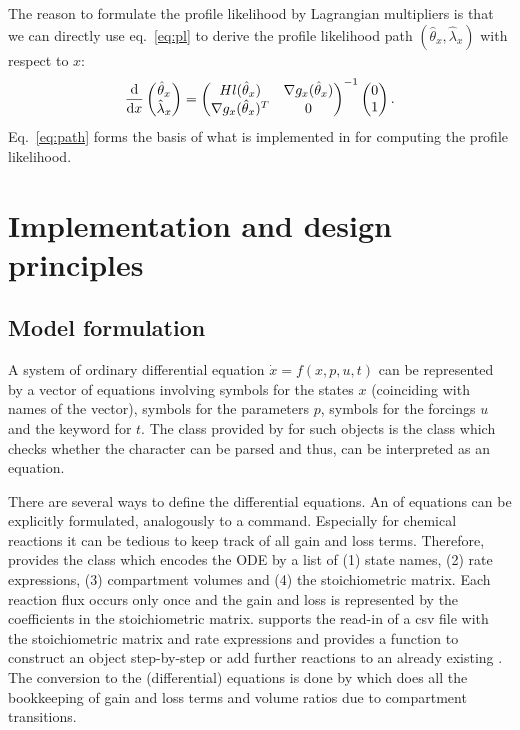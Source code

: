 \documentclass[article]{jss}
\begin{document}
The reason to formulate the profile likelihood by Lagrangian multipliers is that we can directly use eq.~\eqref{eq:pl} to derive the profile likelihood path $(\hat \theta_x, \hat\lambda_x)$ with respect to $x$:
\begin{align}
	\frac{\rm d}{{\rm d} x}
	\begin{pmatrix}
		\hat\theta_x \\ \hat\lambda_x
	\end{pmatrix} =
	\begin{pmatrix}
		Hl(\hat\theta_x) & \nabla g_x(\hat \theta_x)\\
		\nabla g_x(\hat\theta_x)^T & 0
	\end{pmatrix}^{-1}
	\begin{pmatrix}
		0 \\ 1
	\end{pmatrix}.
	\label{eq:path}
\end{align}
Eq.~\eqref{eq:path} forms the basis of what is implemented in  for computing the profile likelihood.





\section{Implementation and design principles}
\label{sec:implementation}

\subsection{Model  formulation}

A system of ordinary differential equation $\dot x = f(x, p, u, t)$ can be represented by a  vector of equations involving symbols for the states $x$ (coinciding with names of the vector), symbols for the parameters $p$, symbols for the forcings $u$ and the keyword  for $t$. The class provided by  for such objects is the  class which checks whether the character can be parsed and thus, can be interpreted as an equation.

There are several ways to define the differential equations. An  of equations can be explicitly formulated, analogously to a  command. Especially for chemical reactions it can be tedious to keep track of all gain and loss terms. Therefore,  provides the  class which encodes the ODE by a list of (1) state names, (2) rate expressions, (3) compartment volumes and (4) the stoichiometric matrix. Each reaction flux occurs only once and the gain and loss is represented by the coefficients in the stoichiometric matrix.  supports the read-in of a csv file with the stoichiometric matrix and rate expressions and provides a function  to construct an  object step-by-step or add further reactions to an already existing . The conversion to the (differential) equations is done by  which does all the bookkeeping of gain and loss terms and volume ratios due to compartment transitions.
\end{document}
